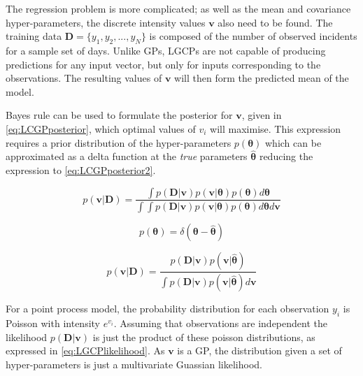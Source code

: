 \documentclass[a4paper,11pt]{report}
\begin{document}
The regression problem is more complicated; as well as the mean and covariance hyper-parameters, the discrete intensity values \(\mathbf{v}\) also need to be found. The training data \(\mathbf{D} = \{y_1,y_2, ..., y_N\}\) is composed of the number of observed incidents for a sample set of days. Unlike GPs, LGCPs are not capable of producing predictions for any input vector, but only for inputs corresponding to the observations. The resulting values of \(\mathbf{v}\) will then form the predicted mean of the model. \par

Bayes rule can be used to formulate the posterior for \(\mathbf{v}\), given in \ref{eq:LCGPposterior}, which optimal values of \(v_i\) will maximise. This expression requires a prior distribution of the hyper-parameters \(p(\boldsymbol{\theta})\) which can be approximated as a delta function at the \textit{true} parameters \(\hat{\boldsymbol{\theta}}\) reducing the expression to \ref{eq:LCGPposterior2}.

\singlespacing

\begin{equation} \label{eq:LCGPposterior}
p(\mathbf{v | D}) = \frac{\int{p(\mathbf{D|v})p(\mathbf{v}|\boldsymbol{\theta})p(\boldsymbol{\theta}) d\boldsymbol{\theta}}}{\int{\int{p(\mathbf{D|v})p(\mathbf{v}|\boldsymbol{\theta})p(\boldsymbol{\theta}) d\boldsymbol{\theta} d\mathbf{v}}}}
\end{equation}

\begin{equation}
p(\boldsymbol{\theta}) = \delta(\boldsymbol{\theta} - \hat{\boldsymbol{\theta}})
\end{equation}

\begin{equation} \label{eq:LCGPposterior2}
p(\mathbf{v | D}) = \frac{p(\mathbf{D|v})p(\mathbf{v}|\hat{\boldsymbol{\theta}}) }{\int{p(\mathbf{D|v})p(\mathbf{v}|\hat{\boldsymbol{\theta}}) d\mathbf{v}}}
\end{equation}

\doublespacing

For a point process model, the probability distribution for each observation \(y_i\) is Poisson with intensity \(e^{v_i}\). Assuming that observations are independent the likelihood \(p(\mathbf{D|v})\) is just the product of these poisson distributions, as expressed in \ref{eq:LGCPlikelihood}. As \(\mathbf{v}\) is a GP, the distribution given a set of hyper-parameters is just a multivariate Guassian likelihood. 
\end{document}
